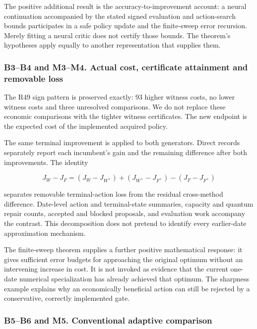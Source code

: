 \documentclass[ecta,nameyear,draft]{econsocart}
\begin{document}
The positive additional result is the accuracy-to-improvement account: a
neural continuation accompanied by the stated signed evaluation and
action-search bounds participates in a safe policy update and the
finite-sweep error recursion. Merely fitting a neural critic does not
certify those bounds. The theorem's hypotheses apply equally to another
representation that supplies them.

\hypertarget{b3b4-and-m3m4.-actual-cost-certificate-attainment-and-removable-loss}{%
\subsubsection{B3--B4 and M3--M4. Actual cost, certificate attainment
and removable
loss}\label{b3b4-and-m3m4.-actual-cost-certificate-attainment-and-removable-loss}}

The R49 sign pattern is preserved exactly: 93 higher witness costs, no
lower witness costs and three unresolved comparisons. We do not replace
these economic comparisons with the tighter witness certificates. The
new endpoint is the expected cost of the implemented acquired policy.

The same terminal improvement is applied to both generators. Direct
records separately report each incumbent's gain and the remaining
difference after both improvements. The identity

\[
 J_W-J_F=(J_W-J_{W^+})+(J_{W^+}-J_{F^+})-(J_F-J_{F^+})
\]

separates removable terminal-action loss from the residual cross-method
difference. Date-level action and terminal-state summaries, capacity and
quantum repair counts, accepted and blocked proposals, and evaluation
work accompany the contrast. This decomposition does not pretend to
identify every earlier-date approximation mechanism.

The finite-sweep theorem supplies a further positive mathematical
response: it gives sufficient error budgets for approaching the original
optimum without an intervening increase in cost. It is not invoked as
evidence that the current one-date numerical specialization has already
achieved that optimum. The sharpness example explains why an
economically beneficial action can still be rejected by a conservative,
correctly implemented gate.

\hypertarget{b5b6-and-m5.-conventional-adaptive-comparison}{%
\subsubsection{B5--B6 and M5. Conventional adaptive
comparison}\label{b5b6-and-m5.-conventional-adaptive-comparison}}
\end{document}
